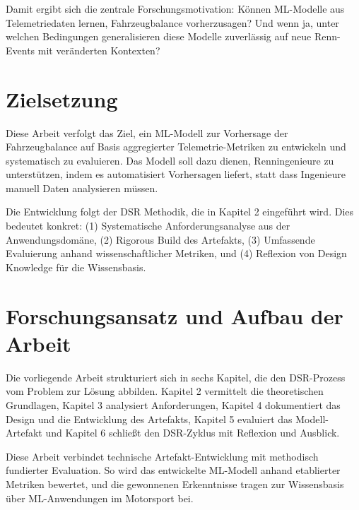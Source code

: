 Damit ergibt sich die zentrale Forschungsmotivation: Können \ac{ML}-Modelle aus Telemetriedaten lernen, Fahrzeugbalance vorherzusagen? Und wenn ja, unter welchen Bedingungen generalisieren diese Modelle zuverlässig auf neue Renn-Events mit veränderten Kontexten?

\section{Zielsetzung}

Diese Arbeit verfolgt das Ziel, ein \ac{ML}-Modell zur Vorhersage der Fahrzeugbalance auf Basis aggregierter Telemetrie-Metriken zu entwickeln und systematisch zu evaluieren. Das Modell soll dazu dienen, Renningenieure zu unterstützen, indem es automatisiert Vorhersagen liefert, statt dass Ingenieure manuell Daten analysieren müssen.

Die Entwicklung folgt der \ac{DSR} Methodik, die in Kapitel 2 eingeführt wird. Dies bedeutet konkret: (1) Systematische Anforderungsanalyse aus der Anwendungsdomäne, (2) Rigorous Build des Artefakts, (3) Umfassende Evaluierung anhand wissenschaftlicher Metriken, und (4) Reflexion von Design Knowledge für die Wissensbasis.

\section{Forschungsansatz und Aufbau der Arbeit}

Die vorliegende Arbeit strukturiert sich in sechs Kapitel, die den \ac{DSR}-Prozess vom Problem zur Lösung abbilden. Kapitel 2 vermittelt die theoretischen Grundlagen, Kapitel 3 analysiert Anforderungen, Kapitel 4 dokumentiert das Design und die Entwicklung des Artefakts, Kapitel 5 evaluiert das Modell-Artefakt und Kapitel 6 schließt den \ac{DSR}-Zyklus mit Reflexion und Ausblick.

Diese Arbeit verbindet technische Artefakt-Entwicklung mit methodisch fundierter 
Evaluation. So wird das entwickelte \ac{ML}-Modell anhand etablierter Metriken bewertet, 
und die gewonnenen Erkenntnisse tragen zur Wissensbasis über \ac{ML}-Anwendungen im 
Motorsport bei.